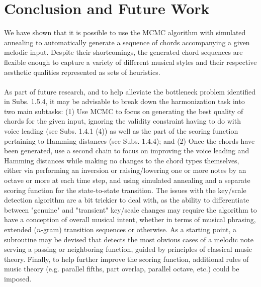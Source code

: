 \documentclass[twoside]{article}
\begin{document}
	\section{Conclusion and Future Work}
	We have shown that it is possible to use the MCMC algorithm with simulated annealing to automatically generate a sequence of chords accompanying a given melodic input. Despite their shortcomings, the generated chord sequences are flexible enough to capture a variety of different musical styles and their respective aesthetic qualities represented as sets of heuristics.
	\\\\
	As part of future research, and to help alleviate the bottleneck problem identified in Subs. 1.5.4, it may be advisable to break down the harmonization task into two main subtasks: (1) Use MCMC to focus on generating the best quality of chords for the given input, ignoring the validity constraint having to do with voice leading (see Subs. 1.4.1 (4)) as well as the part of the scoring function pertaining to Hamming distances (see Subs. 1.4.4); and (2) Once the chords have been generated, use a second chain to focus on improving the voice leading and Hamming distances while making no changes to the chord types themselves, either via performing an inversion or raising/lowering one or more notes by an octave or more at each time step, and using simulated annealing and a separate scoring function for the state-to-state transition. The issues with the key/scale detection algorithm are a bit trickier to deal with, as the ability to differentiate between "genuine" and "transient" key/scale changes may require the algorithm to have a conception of overall musical intent, whether in terms of musical phrasing, extended ($n$-gram) transition sequences or otherwise. As a starting point, a subroutine may be devised that detects the most obvious cases of a melodic note serving a passing or neighboring function, guided by principles of classical music theory. Finally, to help further improve the scoring function, additional rules of music theory (e.g. parallel fifths, part overlap, parallel octave, etc.) could be imposed.
	\fi
\end{document}
